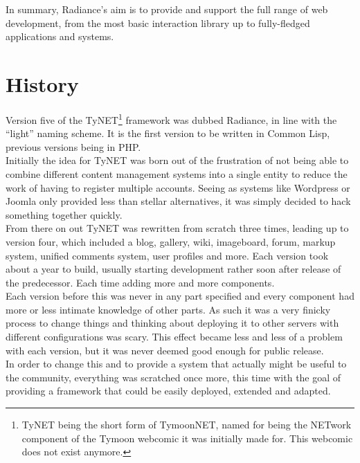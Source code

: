 In summary, Radiance's aim is to provide and support the full range of web development, from the most basic interaction library up to fully-fledged applications and systems.

\section{History}\label{sec:history}
Version five of the TyNET\footnote{TyNET being the short form of TymoonNET, named for being the NETwork component of the Tymoon webcomic it was initially made for. This webcomic does not exist anymore.} framework was dubbed Radiance, in line with the ``light'' naming scheme. It is the first version to be written in Common Lisp, previous versions being in PHP. \\

Initially the idea for TyNET was born out of the frustration of not being able to combine different content management systems into a single entity to reduce the work of having to register multiple accounts. Seeing as systems like Wordpress or Joomla only provided less than stellar alternatives, it was simply decided to hack something together quickly. \\

From there on out TyNET was rewritten from scratch three times, leading up to version four, which included a blog, gallery, wiki, imageboard, forum, markup system, unified comments system, user profiles and more. Each version took about a year to build, usually starting development rather soon after release of the predecessor. Each time adding more and more components. \\

Each version before this was never in any part specified and every component had more or less intimate knowledge of other parts. As such it was a very finicky process to change things and thinking about deploying it to other servers with different configurations was scary. This effect became less and less of a problem with each version, but it was never deemed good enough for public release. \\

In order to change this and to provide a system that actually might be useful to the community, everything was scratched once more, this time with the goal of providing a framework that could be easily deployed, extended and adapted. 

